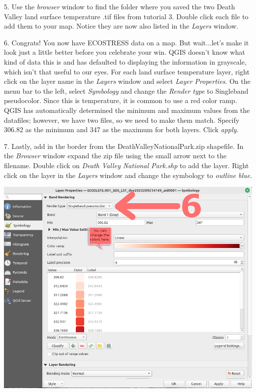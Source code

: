 \documentclass[oneside,a4paper,11pt,explicit]{book}
\begin{document}
\vspace{1em}

5. Use the \textit{browser} window to find the folder where you saved the two Death Valley land surface temperature .tif files from tutorial 3. Double click each file to add them to your map. Notice they are now also listed in the \textit{Layers} window.

6. Congrats! You now have ECOSTRESS data on a map. But wait...let's make it look just a little better before you celebrate your win. QGIS doesn't know what kind of data this is and has defaulted to displaying the information in grayscale, which isn't that useful to our eyes. For each land surface temperature layer, right click on the layer name in the \textit{Layers} window and select \textit{Layer Properties}. On the menu bar to the left, select \textit{Symbology} and change the \textit{Render type} to Singleband pseudocolor. Since this is temperature, it is common to use a red color ramp. QGIS has automatically determined the minimum and maximum values from the datafiles; however, we have two files, so we need to make them match. Specify 306.82 as the minimum and 347 as the maximum for both layers. Click \textit{apply}.

7. Lastly, add in the border from the DeathValleyNationalPark.zip shapefile. In the \textit{Browser} window expand the zip file using the small arrow next to the filename. Double click on \textit{Death Valley National Park.shp} to add the layer. Right click on the layer in the \textit{Layers} window and change the symbology to \textit{outline blue}. 

\vspace{1em}

\centerline{\includegraphics[width=.75\textwidth]{SymbologyLST.png}}
\end{document}
